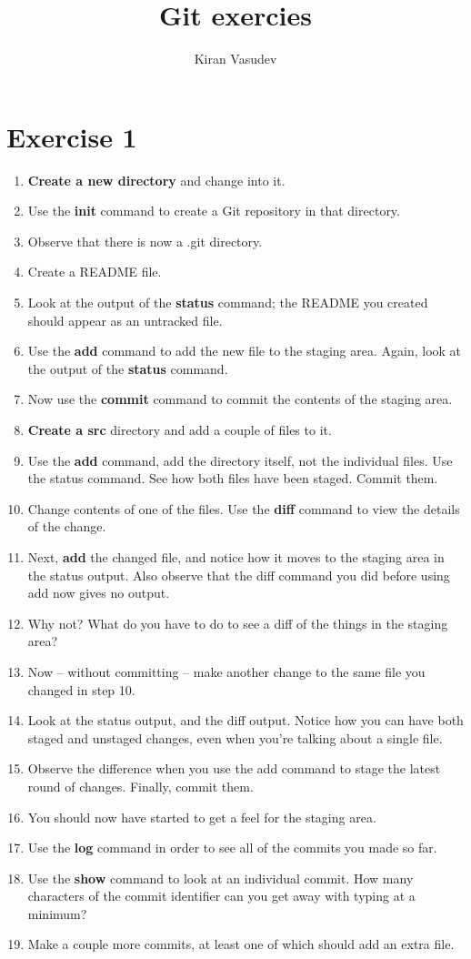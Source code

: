 \documentclass{article}
\title{Git exercies}
\author{Kiran Vasudev}
\begin{document}
	\maketitle
	
	\newpage
	
	\section{Exercise 1}
	\begin{enumerate}
\item \textbf{Create a new directory} and change into it.
\item Use the \textbf{init} command to create a Git repository in that directory.
\item Observe that there is now a .git directory.
\item Create a README file.
\item Look at the output of the \textbf{status} command; the README you created should appear as an untracked file.
\item Use the \textbf{add} command to add the new file to the staging area. Again, look at the output of the \textbf{status} command.
\item Now use the \textbf{commit} command to commit the contents of the staging area.
\item \textbf{Create a src} directory and add a couple of files to it.
\item Use the \textbf{add} command, add the directory itself, not the individual files. Use the status command. See how both files have been staged. Commit them.
\item Change contents of one of the files. Use the \textbf{diff} command to view the details of the change.
\item Next, \textbf{add} the changed file, and notice how it moves to the staging area in the status output. Also observe that the diff command you did before using add now gives no output.
\item Why not? What do you have to do to see a diff of the things in the staging area?
\item Now – without committing – make another change to the same file you changed in step 10.
\item Look at the status output, and the diff output. Notice how you can have both staged and unstaged changes, even when you’re talking about a single file. 
\item Observe the difference when you use the add command to stage the latest round of changes. Finally, commit them. 
\item You should now have started to get a feel for the staging area.
\item Use the \textbf{log} command in order to see all of the commits you made so far.
\item Use the \textbf{show} command to look at an individual commit. How many characters of the commit identifier can you get away with typing at a minimum?
\item Make a couple more commits, at least one of which should add an extra file.
	\end{enumerate}
\end{document}
